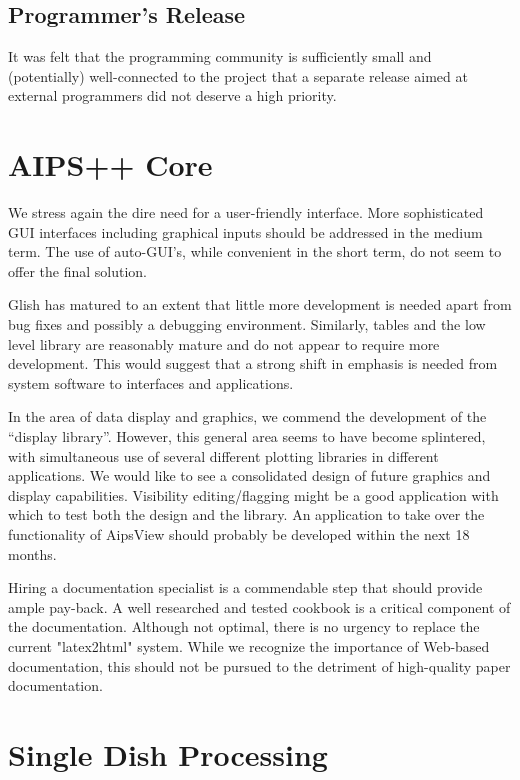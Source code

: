 \subsection{Programmer's Release}

It was felt that the programming community is sufficiently small and
(potentially) well-connected to the project that a separate release
aimed at external programmers did not deserve a high priority.


\section{AIPS++ Core}

We stress again the dire need for a user-friendly interface. More
sophisticated GUI interfaces including graphical inputs should be
addressed in the medium term. The use of auto-GUI's, while 
convenient in the short term, do not seem to offer the final solution.

Glish has matured to an extent that little more development is needed
apart from bug fixes and possibly a debugging environment. Similarly,
tables and the low level library are reasonably mature and do not 
appear to require more development. This would suggest that a strong
shift in emphasis is needed from system software to interfaces and
applications. 

In the area of data display and graphics, we commend the development
of the ``display library''. However, this general area seems to have
become splintered, with simultaneous use of several different plotting
libraries in different applications.  We would like to see a
consolidated design of future graphics and display capabilities.
Visibility editing/flagging might be a good application with which to
test both the design and the library.  An application to take over the
functionality of AipsView should probably be developed within the next
18 months.

Hiring a documentation specialist is a commendable step that should
provide ample pay-back.  A well researched and tested cookbook is a
critical component of the documentation. Although not optimal, there is
no urgency to replace the current "latex2html" system. While we
recognize the importance of Web-based documentation, this should not
be pursued to the detriment of high-quality paper documentation.

\section{Single Dish Processing}

